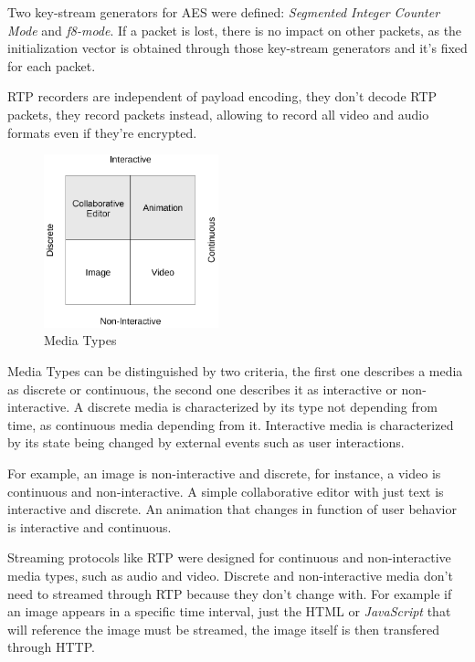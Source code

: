   Two key-stream generators for \ac{AES} were defined: \textit{Segmented Integer Counter Mode} and \textit{f8-mode}. If a packet is lost, there is no impact on other packets, as the initialization vector is obtained through those key-stream generators and it's fixed for each packet.

  \ac{RTP} recorders are independent of payload encoding, they don't decode \ac{RTP} packets, they record packets instead, allowing to record all video and audio formats even if they're encrypted.

\begin{figure}[H]
	\centering
	\includegraphics[width=0.45\textwidth]{figures/media_types.png}
	\caption{Media Types}
\end{figure}

	Media Types can be distinguished by two criteria, the first one describes a media as discrete or continuous, the second one describes it as interactive or non-interactive. A discrete media is characterized by its type not depending from time, as continuous media depending from it. Interactive media is characterized by its state being changed by external events such as user interactions.

	For example, an image is non-interactive and discrete, for instance, a video is continuous and non-interactive. A simple collaborative editor with just text is interactive and discrete. An animation that changes in function of user behavior is interactive and continuous.

	Streaming protocols like \ac {RTP} were designed for continuous and non-interactive media types, such as audio and video. Discrete and non-interactive media don't need to streamed through \ac{RTP} because they don't change with. For example if an image appears in a specific time interval, just the \ac{HTML} or \textit{JavaScript} that will reference the image must be streamed, the image itself is then transfered through \ac{HTTP}.


